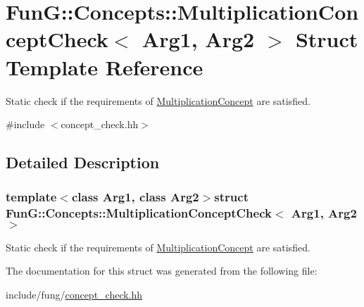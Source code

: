 \hypertarget{structFunG_1_1Concepts_1_1MultiplicationConceptCheck}{\section{Fun\-G\-:\-:Concepts\-:\-:Multiplication\-Concept\-Check$<$ Arg1, Arg2 $>$ Struct Template Reference}
\label{structFunG_1_1Concepts_1_1MultiplicationConceptCheck}
}


Static check if the requirements of \hyperlink{structFunG_1_1Concepts_1_1MultiplicationConcept}{Multiplication\-Concept} are satisfied.  




{\ttfamily \#include $<$concept\-\_\-check.\-hh$>$}



\subsection{Detailed Description}
\subsubsection*{template$<$class Arg1, class Arg2$>$struct Fun\-G\-::\-Concepts\-::\-Multiplication\-Concept\-Check$<$ Arg1, Arg2 $>$}

Static check if the requirements of \hyperlink{structFunG_1_1Concepts_1_1MultiplicationConcept}{Multiplication\-Concept} are satisfied. 

The documentation for this struct was generated from the following file\-:\begin{DoxyCompactItemize}
\item 
include/fung/\hyperlink{concept__check_8hh}{concept\-\_\-check.\-hh}\end{DoxyCompactItemize}
